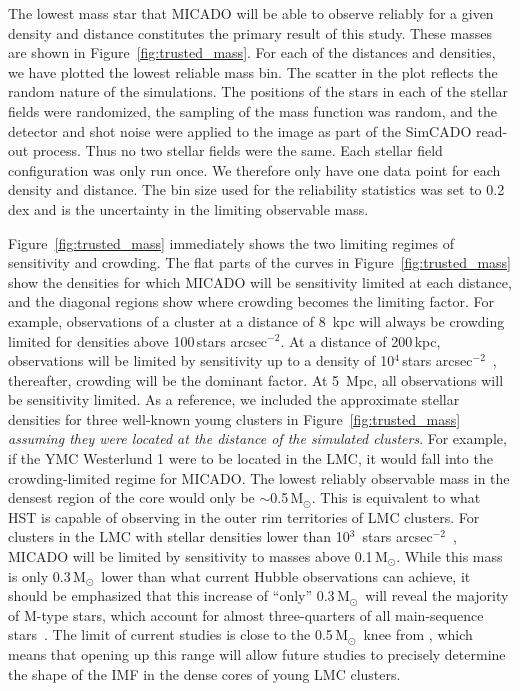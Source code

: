 \documentclass{aa}
\newcommand{\msun}{M$_\odot$~}
\newcommand{\msune}{M$_\odot$}
\newcommand{\s}{$\sim$}
\newcommand{\h}[1]{$^{#1}$}
\newcommand{\spa}{stars arcsec$^{-2}$~}
\newcommand{\spae}{stars arcsec$^{-2}$}
\begin{document}
The lowest mass star that MICADO will be able to observe reliably for a given density and distance constitutes the primary result of this study.
These masses are shown in Figure~\ref{fig:trusted_mass}.
For each of the distances and densities, we have plotted the lowest reliable mass bin.
The scatter in the plot reflects the random nature of the simulations.
The positions of the stars in each of the stellar fields were randomized, the sampling of the mass function was random, and the detector and shot noise were applied to the image as part of the SimCADO read-out process.
Thus no two stellar fields were the same.
Each stellar field configuration was only run once.
We therefore only have one data point for each density and distance.
The bin size used for the reliability statistics was set to 0.2 dex and is the uncertainty in the limiting observable mass.

Figure~\ref{fig:trusted_mass} immediately shows the two limiting regimes of sensitivity and crowding.
The flat parts of the curves in Figure~\ref{fig:trusted_mass} show the densities for which MICADO will be sensitivity limited at each distance, and the diagonal regions show where crowding becomes the limiting factor.
For example, observations of a cluster at a distance of 8\, kpc will always be crowding limited for densities above 100\,\spae.
At a distance of 200\,kpc, observations will be limited by sensitivity up to a density of 10\h4\,\spa, thereafter, crowding will be the dominant factor.
At 5\, Mpc, all observations will be sensitivity limited.
As a reference, we included the approximate stellar densities for three well-known young clusters in Figure~\ref{fig:trusted_mass} \textit{\textup{assuming they were located at the distance of the simulated clusters}}.
For example, if the YMC Westerlund 1 were to be located in the LMC, it would fall into the crowding-limited regime for MICADO\@.
The lowest reliably observable mass in the densest region of the core would only be \s0.5\,\msune.
This is equivalent to what HST is capable of observing in the outer rim territories of LMC clusters.
For clusters in the LMC with stellar densities lower than 10\h3~\spa , MICADO will be limited by sensitivity to masses above 0.1\,\msune.
While this mass is only 0.3\,\msun lower than what current Hubble observations can achieve, it should be emphasized that this increase of ``only'' 0.3\,\msun will reveal the majority of M-type stars, which account for almost three-quarters of all main-sequence stars~\citep{ledrew2001}.
The limit of current studies is close to the 0.5\,\msun knee from \citet{kroupa2001}, which means that opening up this range will allow future studies to precisely determine the shape of the IMF in the dense cores of young LMC clusters.
\end{document}
